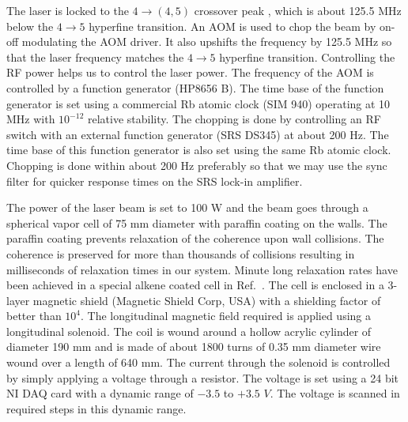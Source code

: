 The laser is locked to the  $ 4 \rightarrow (4,5) $ crossover peak , which is about 125.5 MHz below the $ 4 \rightarrow 5 $ hyperfine transition. An AOM is used to chop the beam by on-off modulating the AOM driver. It also upshifts the frequency by 125.5 MHz so that the laser frequency matches the $4\rightarrow 5 $ hyperfine transition. Controlling the RF power helps us to control the laser power. The frequency of the AOM is controlled by a function generator (HP8656 B). The time base of the function generator is set using a commercial Rb atomic clock (SIM 940) operating at 10 MHz with $10^{-12}$ relative stability. The chopping is done by controlling an RF switch with an external function generator (SRS DS345) at about 200 Hz. The time base of this function generator is also set using the same Rb atomic clock. Chopping is done within about 200 Hz preferably so that we may use the sync filter for quicker response times on the SRS lock-in amplifier.

The power of the laser beam is set to 100 \textmu W and the beam goes through a spherical vapor cell of 75 mm diameter with paraffin coating on the walls. The paraffin coating prevents relaxation of the coherence upon wall collisions. The coherence is preserved for more than thousands of collisions resulting in milliseconds of relaxation times in our system. Minute long relaxation rates have been achieved in a special alkene coated cell in Ref.\ \cite{BKL10}. The cell is enclosed in a 3-layer magnetic shield (Magnetic Shield Corp, USA) with a shielding factor of better than $10^4$. The longitudinal magnetic field required is applied using a longitudinal solenoid. The coil is wound around a hollow acrylic cylinder of diameter 190 mm and is made of about 1800 turns of 0.35 mm diameter wire wound over a length of 640 mm. The current through the solenoid is controlled by simply applying a voltage through a resistor. The voltage is set using a 24 bit NI DAQ card with a dynamic range of $-3.5$ to $+3.5$ $V$. The voltage is scanned in required steps in this dynamic range. 

